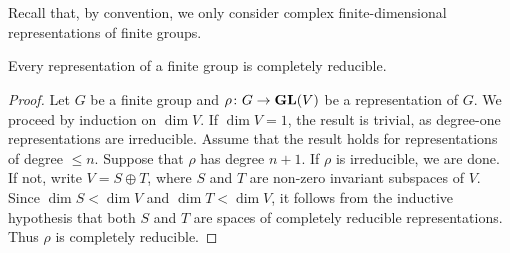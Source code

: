 \chapter{}

Recall that, by convention, we only consider complex 
finite-dimensional representations of finite groups.

\begin{theorem}[Maschke]
    Every representation of a finite group is completely reducible.
\end{theorem}

\begin{proof}
    Let $G$ be a finite group and $\rho\colon G\to\mathbf{GL}(V)$ be a representation of $G$. We proceed
    by induction on $\dim V$.
    If $\dim V=1$, the result is trivial, as degree-one representations are irreducible. Assume that
    the result holds for representations of degree $\leq n$. Suppose that $\rho$ has degree $n+1$. 
    If $\rho$ is irreducible, we are done. If not, write $V=S\oplus T$, where $S$ and $T$
    are non-zero invariant subspaces of $V$. Since $\dim S<\dim V$ and $\dim T<\dim V$, it follows from
    the inductive hypothesis that
    both $S$ and $T$ are spaces of completely reducible representations. 
    Thus $\rho$ is completely reducible.
\end{proof}

